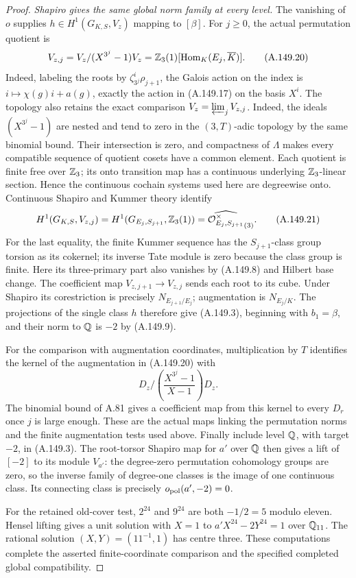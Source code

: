 \begin{proof}
\emph{Shapiro gives the same global norm family at every level.}
The vanishing of \(o\) supplies
\(h\in H^1(G_{K,S},V_z)\) mapping to \([\beta]\).
For \(j\geq0\), the actual permutation quotient is
\[
 V_{z,j}=V_z/(X^{3^j}-1)V_z
          =\mathbb Z_3(1)[\operatorname{Hom}_K(E_j,\overline K)].
\tag{A.149.20}
\]
Indeed, labeling the roots by
\(\zeta_{3^j}^i\rho_{j+1}\), the Galois action on
the index is \(i\mapsto\chi(g)i+a(g)\), exactly
the action in (A.149.17) on the basis \(X^i\).
The topology also retains the exact comparison
\(V_z=\varprojlim_j V_{z,j}\).
Indeed, the ideals \((X^{3^j}-1)\) are nested
and tend to zero in the \((3,T)\)-adic topology
by the same binomial bound.  Their intersection
is zero, and compactness of \(\Lambda\) makes
every compatible sequence of quotient cosets
have a common element.  Each quotient is finite
free over \(\mathbb Z_3\); its onto transition map
has a continuous underlying \(\mathbb Z_3\)-linear
section.  Hence the continuous cochain systems
used here are degreewise onto.
Continuous Shapiro and Kummer theory identify
\[
 H^1(G_{K,S},V_{z,j})
  =H^1(G_{E_j,S_{j+1}},\mathbb Z_3(1))
  =\widehat{\mathcal O_{E_j,S_{j+1}}^{\times}}_{(3)}.
\tag{A.149.21}
\]
For the last equality, the finite Kummer
sequence has the \(S_{j+1}\)-class group torsion
as its cokernel; its inverse Tate module is
zero because the class group is finite.
Here its three-primary part also vanishes
by (A.149.8) and Hilbert base change.
The coefficient map
\(V_{z,j+1}\to V_{z,j}\) sends each root to its
cube.  Under Shapiro its corestriction is
precisely \(N_{E_{j+1}/E_j}\); augmentation is
\(N_{E_j/K}\).
The projections of the single class \(h\)
therefore give (A.149.3), beginning with
\(b_1=\beta\), and their norm to \(\mathbb Q\) is
\(-2\) by (A.149.9).

For the comparison with augmentation coordinates,
multiplication by \(T\) identifies the kernel
of the augmentation in (A.149.20) with
\[
 D_z\Big/\left(\frac{X^{3^j}-1}{X-1}\right)D_z.
\tag{A.149.22}
\]
The binomial bound of A.81 gives a coefficient
map from this kernel to every \(D_r\) once
\(j\) is large enough.  These are the actual
maps linking the permutation norms and the
finite augmentation tests used above.
Finally include level \(\mathbb Q\), with target
\(-2\), in (A.149.3).  The root-torsor Shapiro
map for \(a'\) over \(\mathbb Q\) then gives a lift
of \([-2]\) to its module \(V_{a'}\): the
degree-zero permutation cohomology groups
are zero, so the inverse family of degree-one
classes is the image of one continuous class.
Its connecting class is precisely
\(o_{\rm pol}(a',-2)=0\).

For the retained old-cover test, \(2^{24}\) and
\(9^{24}\) are both \(-1/2=5\) modulo eleven.
Hensel lifting gives a unit solution with
\(X=1\) to
\(a'X^{24}-2Y^{24}=1\) over \(\mathbb Q_{11}\).
The rational solution \((X,Y)=(11^{-1},1)\)
has centre three.
These computations complete the asserted
finite-coordinate comparison and the
specified completed global compatibility.
\end{proof}

